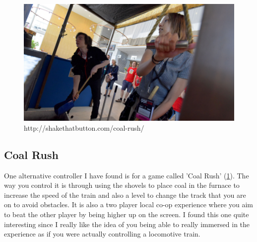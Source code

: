 \documentclass{article}
\begin{document}
\begin{figure}[ht]
  \includegraphics[width=\textwidth,height=\textheight,keepaspectratio]{coal_rush.PNG}
  \caption{http://shakethatbutton.com/coal-rush/}
  \label{fig:Coal Rush}
\end{figure}

\subsection{Coal Rush}

One alternative controller I have found is for a game called 'Coal Rush' (\ref{fig:Coal Rush}). The way you control it is through using the shovels to place coal in the furnace to increase the speed of the train and also a level to change the track that you are on to avoid obstacles. It is also a two player local co-op experience where you aim to beat the other player by being higher up on the screen. I found this one quite interesting since I really like the idea of you being able to really immersed in the experience as if you were actually controlling a locomotive train.
\end{document}
